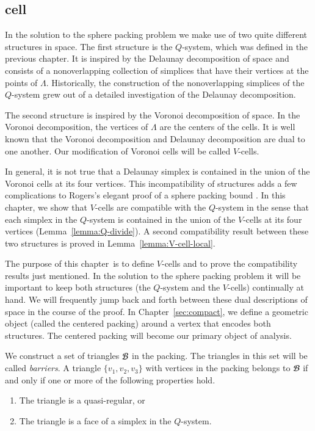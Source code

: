 \subsection{cell}
\label{sec:cells} \label{sec:vcells}

In the solution to  the sphere packing problem we make use of two quite
different structures in space.  The first structure is the
$Q$-system, which was defined in the previous chapter.  It is
inspired by the Delaunay decomposition of space and consists of a
nonoverlapping collection of simplices that have their vertices at
the points of $\Lambda$.  Historically, the construction of the
nonoverlapping simplices of the $Q$-system grew out of a detailed
investigation of the Delaunay decomposition.

The second structure is inspired by the Voronoi decomposition of
space. In the Voronoi decomposition, the vertices of $\Lambda$ are
the centers of the cells.  It is well known that the Voronoi
decomposition and Delaunay decomposition are dual to one another.
Our modification of Voronoi cells will be called $V$-cells.

In general, it is not true that a Delaunay simplex is contained in
the union of the Voronoi cells at its four vertices.  This
incompatibility of structures adds a few complications to Rogers's
elegant proof of a sphere packing bound \cite{Rog58}. In this
chapter, we show that $V$-cells are compatible with the $Q$-system
in the sense that each simplex in the  $Q$-system is contained in
the union of the $V$-cells at its four vertices
(Lemma~\ref{lemma:Q-divide}). A second compatibility result
between these two structures is proved in
Lemma~\ref{lemma:V-cell-local}.

The purpose of this chapter\ is to define $V$-cells and to prove the
compatibility results just mentioned.  In the solution to  the sphere
packing problem it will be important to keep both structures (the
$Q$-system and the $V$-cells) continually at hand. We will
frequently jump back and forth between these dual descriptions of
space in the course of the proof.  In Chapter~\ref{sec:compact}, we
define a geometric object (called the centered packing) around a
vertex that encodes both structures.  The centered packing will
become our primary object of analysis.



\begin{definition}\label{def:barrier}
We construct a set of triangles ${\mathcal B}$ in the packing.  The
triangles in this set will be called {\it barriers}.
A triangle $\{v_1,v_2,v_3\}$ with vertices in the packing belongs to
${\mathcal B}$ if and only if  one or more of the following properties
hold.
\begin{enumerate}
    \item The triangle is a
    quasi-regular, or
    \item The triangle is a face of a simplex in the $Q$-system.
\end{enumerate}
\end{definition}

